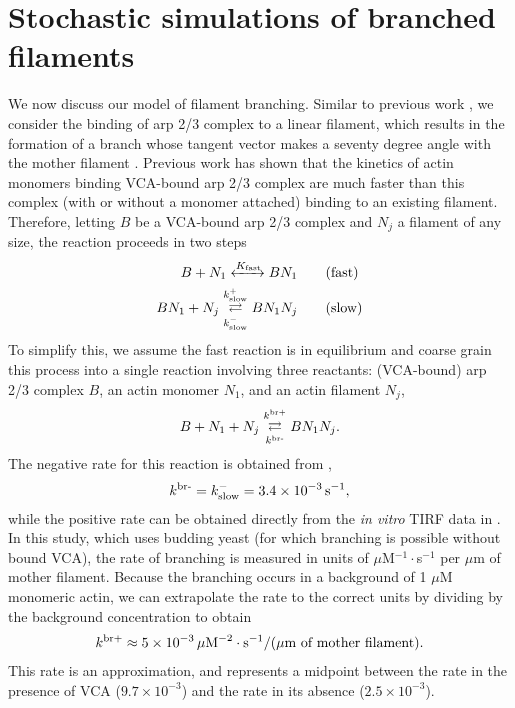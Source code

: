 \documentclass[11pt]{article}
\begin{document}
\section{Stochastic simulations of branched filaments \label{sec:BF}}
We now discuss our model of filament branching. Similar to previous work \cite{ni2019turnover}, we consider the binding of arp 2/3 complex to a linear filament, which results in the formation of a branch whose tangent vector makes a seventy degree angle with the mother filament \cite{pollard2007regulation}. Previous work \cite{beltzner2008pathway} has shown that the kinetics of actin monomers binding VCA-bound arp 2/3 complex are much faster than this complex (with or without a monomer attached) binding to an existing filament. Therefore, letting $B$ be a VCA-bound arp 2/3 complex and $N_j$ a filament of any size, the reaction proceeds in two steps
\begin{subequations}
\label{eq:BothRxnsArp}
\begin{align}
\label{eq:fastrxn}
B + N_1 \xleftrightarrow{K_\text{fast}} BN_1 \qquad & \text{(fast)}\\
BN_1 + N_j \overset{k_\text{slow}^+}{\underset{k_\text{slow}^-}\rightleftarrows} BN_1N_j \qquad & \text{(slow)}
\end{align}
\end{subequations}
To simplify this, we assume the fast reaction is in equilibrium and coarse grain this process into a single reaction involving three reactants: (VCA-bound) arp 2/3 complex $B$, an actin monomer $N_1$, and an actin filament $N_j$, 
\begin{equation}
\label{eq:ArpRxn}
B + N_1 + N_j \overset{k^\text{br+}}{\underset{k^\text{br-}}\rightleftarrows} BN_1N_j. 
\end{equation}
The negative rate for this reaction is obtained from \cite{beltzner2008pathway},
\begin{gather*}
k^\text{br-} = k_\text{slow}^- = 3.4 \times 10^{-3} \, \text{s}^{-1},
\end{gather*}
while the positive rate can be obtained directly from the \emph{in vitro} TIRF data in \cite{smith2013pathway}. In this study, which uses budding yeast (for which branching is possible without bound VCA), the rate of branching is measured in units of $\mu$M$^{-1}\cdot$s$^{-1}$ per $\mu$m of mother filament. Because the branching occurs in a background of 1 $\mu$M monomeric actin, we can extrapolate the rate to the correct units by dividing by the background concentration to obtain
\begin{gather*}
k^\text{br+} \approx 5 \times 10^{-3} \, \mu \text{M}^{-2} \cdot \text{s}^{-1}/(\mu\text{m of mother filament}).
\end{gather*}
This rate is an approximation, and represents a midpoint between the rate in the presence of VCA ($9.7 \times 10^{-3}$) and the rate in its absence ($2.5 \times 10^{-3}$). 
\end{document}
